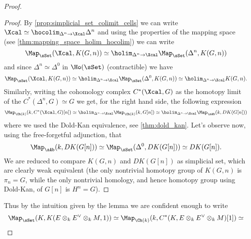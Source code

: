\begin{proof}
\begin{proof}
                    By \cref{prop:simplicial_set_colimit_cells} we can write $\Xcal \simeq \hocolim_{\Delta^n \to \Xcal} \Delta^n$ and using the properties of the mapping space (see \cref{thm:mapping_space_holim_hocolim}) we can write \[\Map_{\sSet}(\Xcal, K(G, n)) \simeq \holim_{\Delta^n \to \Xcal} \Map_{\sSet}(\Delta^n, K(G, n)) \] and since $\Delta^n \simeq \Delta^0$ in $\Ho(\sSet)$ (contractible) we have \[\Map_{\sSet}(\Xcal, K(G, n)) \simeq \holim_{\Delta^n \to \Xcal} \Map_{\sSet}(\Delta^0, K(G, n)) \simeq \holim_{\Delta^n \to \Xcal} K(G, n). \] Similarly, writing the cohomology complex $C^*(\Xcal, G)$ as the homotopy limit of the $C^*(\Delta^n, G) \simeq G$ we get, for the right hand side, the following expression 
                    \[\Map_{\Ch(k)}(k, C^*(\Xcal, G)[n]) \simeq \holim_{\Delta^n \to \Xcal} \Map_{\Ch(k)}(k, G[n]) \simeq \holim_{\Delta^n \to \Xcal} \Map_{\sAb}(k, DK(G[n])) \]  where we used the Dold-Kan equivalence, see \cref{thm:dold_kan}. Let's observe now, using the free-forgetful adjunction, that \[\Map_{\sAb}(k, DK(G[n])) \simeq \Map_{\sSet}(\Delta^0, DK(G[n])) \simeq DK(G[n]). \] We are reduced to compare $K(G, n)$ and $DK(G[n])$ as simplicial set, which are clearly weak equivalent (the only nontrivial homotopy group of $K(G, n)$ is $\pi_n = G$, while the only nontrivial homology, and hence homotopy group using Dold-Kan, of $G[n]$ is $H^n = G$).
                \end{proof}
                Thus by the intuition given by the lemma we are confident enough to write 
                \begin{gather*}
                    \Map_{\sSet}(K, K(E \otimes_k E^{\vee} \otimes_k M, 1)) \simeq \Map_{\Ch(k)}(k, C^*(K, E \otimes_k E^{\vee} \otimes_k M)[1]) \simeq \\

\end{gather*}
\end{proof}
